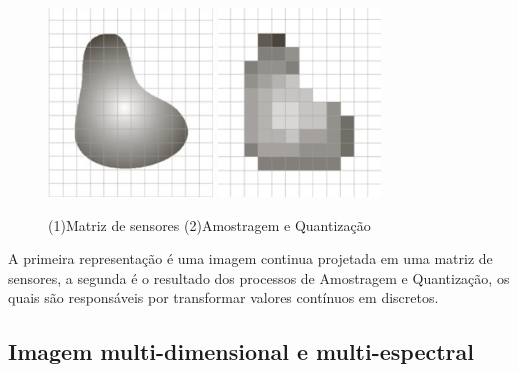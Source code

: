 \documentclass[12pt, a4paper]{article}
\begin{document}
    	\begin{figure}[!htb]
			\begin{center}
				\includegraphics[height=5cm]{Screenshot_2} \quad
				\includegraphics[height=5cm]{Screenshot_3}
			\caption{(1)Matriz de sensores (2)Amostragem e Quantização} 	\label{gdimotes}
			\end{center}
		\end{figure}
    
    A primeira representação é uma imagem continua projetada em uma matriz de sensores, a segunda é o resultado dos processos de Amostragem e Quantização, os quais são responsáveis por transformar valores contínuos em discretos.
    \newpage
    
    \subsection{Imagem multi-dimensional e multi-espectral}
    \vspace{2mm}	
    
\end{document}
